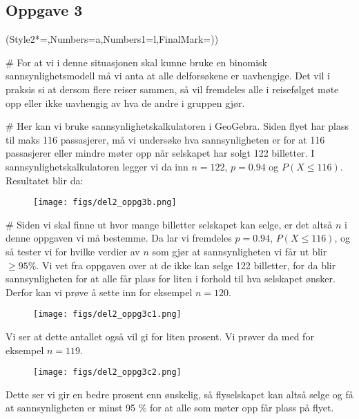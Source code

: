 \subsection*{Oppgave 3}
\begin{easylist}[enumerate]
	\ListProperties(Style2*=,Numbers=a,Numbers1=l,FinalMark={)})
	
	# For at vi i denne situasjonen skal kunne bruke en binomisk sannsynlighetsmodell må vi anta at alle delforsøkene er uavhengige. 
	Det vil i praksis si at dersom flere reiser sammen, så vil fremdeles alle i reisefølget møte opp eller ikke uavhengig av hva de andre i gruppen gjør.
	
	# Her kan vi bruke sannsynlighetskalkulatoren i GeoGebra. 
	Siden flyet har plass til maks 116 passasjerer, må vi undersøke hva sannsynligheten er for at 116 passasjerer eller mindre møter opp når selskapet har solgt 122 billetter. 
	I sannsynlighetskalkulatoren legger vi da inn $n = 122$, $p = 0.94$ og $P(X \leq 116)$. Resultatet blir da:
	\begin{figure}[ht!]
		\centering
		\texttt{[image: figs/del2\_oppg3b.png]}
		\label{fig:del2_oppg3b}
	\end{figure}
	

	# Siden vi skal finne ut hvor mange billetter selskapet kan selge, er det altså $n$ i denne oppgaven vi må bestemme. Da lar vi fremdeles $p = 0.94$, $P(X \leq 116)$, og så tester vi for hvilke verdier av $n$ som gjør at sannsynligheten vi får ut blir $\geq 95\% $. Vi vet fra oppgaven over at de ikke kan selge 122 billetter, for da blir sannsynligheten for at alle får plass for liten i forhold til hva selskapet ønsker. Derfor kan vi prøve å sette inn for eksempel $n = 120$.
	\begin{figure}[ht!]
		\centering
		\texttt{[image: figs/del2\_oppg3c1.png]}
	\end{figure}
	
	Vi ser at dette antallet også vil gi for liten prosent. Vi prøver da med for eksempel $n = 119$.
	
	\begin{figure}[ht!]
		\centering
		\texttt{[image: figs/del2\_oppg3c2.png]}
	\end{figure}
	
	Dette ser vi gir en bedre prosent enn ønskelig, så flyselskapet kan altså selge  og få at sannsynligheten er minst 95 \% for at alle som møter opp får plass på flyet.	
	
	
\end{easylist}

